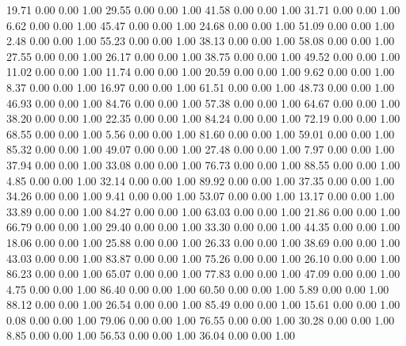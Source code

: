    19.71   0.00   0.00   1.00
   29.55   0.00   0.00   1.00
   41.58   0.00   0.00   1.00
   31.71   0.00   0.00   1.00
    6.62   0.00   0.00   1.00
   45.47   0.00   0.00   1.00
   24.68   0.00   0.00   1.00
   51.09   0.00   0.00   1.00
    2.48   0.00   0.00   1.00
   55.23   0.00   0.00   1.00
   38.13   0.00   0.00   1.00
   58.08   0.00   0.00   1.00
   27.55   0.00   0.00   1.00
   26.17   0.00   0.00   1.00
   38.75   0.00   0.00   1.00
   49.52   0.00   0.00   1.00
   11.02   0.00   0.00   1.00
   11.74   0.00   0.00   1.00
   20.59   0.00   0.00   1.00
    9.62   0.00   0.00   1.00
    8.37   0.00   0.00   1.00
   16.97   0.00   0.00   1.00
   61.51   0.00   0.00   1.00
   48.73   0.00   0.00   1.00
   46.93   0.00   0.00   1.00
   84.76   0.00   0.00   1.00
   57.38   0.00   0.00   1.00
   64.67   0.00   0.00   1.00
   38.20   0.00   0.00   1.00
   22.35   0.00   0.00   1.00
   84.24   0.00   0.00   1.00
   72.19   0.00   0.00   1.00
   68.55   0.00   0.00   1.00
    5.56   0.00   0.00   1.00
   81.60   0.00   0.00   1.00
   59.01   0.00   0.00   1.00
   85.32   0.00   0.00   1.00
   49.07   0.00   0.00   1.00
   27.48   0.00   0.00   1.00
    7.97   0.00   0.00   1.00
   37.94   0.00   0.00   1.00
   33.08   0.00   0.00   1.00
   76.73   0.00   0.00   1.00
   88.55   0.00   0.00   1.00
    4.85   0.00   0.00   1.00
   32.14   0.00   0.00   1.00
   89.92   0.00   0.00   1.00
   37.35   0.00   0.00   1.00
   34.26   0.00   0.00   1.00
    9.41   0.00   0.00   1.00
   53.07   0.00   0.00   1.00
   13.17   0.00   0.00   1.00
   33.89   0.00   0.00   1.00
   84.27   0.00   0.00   1.00
   63.03   0.00   0.00   1.00
   21.86   0.00   0.00   1.00
   66.79   0.00   0.00   1.00
   29.40   0.00   0.00   1.00
   33.30   0.00   0.00   1.00
   44.35   0.00   0.00   1.00
   18.06   0.00   0.00   1.00
   25.88   0.00   0.00   1.00
   26.33   0.00   0.00   1.00
   38.69   0.00   0.00   1.00
   43.03   0.00   0.00   1.00
   83.87   0.00   0.00   1.00
   75.26   0.00   0.00   1.00
   26.10   0.00   0.00   1.00
   86.23   0.00   0.00   1.00
   65.07   0.00   0.00   1.00
   77.83   0.00   0.00   1.00
   47.09   0.00   0.00   1.00
    4.75   0.00   0.00   1.00
   86.40   0.00   0.00   1.00
   60.50   0.00   0.00   1.00
    5.89   0.00   0.00   1.00
   88.12   0.00   0.00   1.00
   26.54   0.00   0.00   1.00
   85.49   0.00   0.00   1.00
   15.61   0.00   0.00   1.00
    0.08   0.00   0.00   1.00
   79.06   0.00   0.00   1.00
   76.55   0.00   0.00   1.00
   30.28   0.00   0.00   1.00
    8.85   0.00   0.00   1.00
   56.53   0.00   0.00   1.00
   36.04   0.00   0.00   1.00
